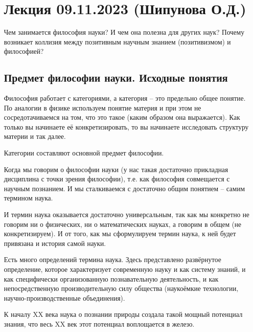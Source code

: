 \documentclass[main.tex]{subfiles}
\begin{document}
\section{Лекция 09.11.2023 (Шипунова О.Д.)}




Чем занимается философия науки?
И чем она полезна для других наук?
Почему возникает коллизия между позитивным научным знанием (позитивизмом) и философией?


\subsection{Предмет философии науки. Исходные понятия}


Философия работает с категориями, а категория -- это предельно общее понятие.
По аналогии в физике используем понятие материя и при этом не сосредотачиваемся на том, что это такое (каким образом она выражается).
Как только вы начинаете её конкретизировать, то вы начинаете исследовать структуру материи и так далее.

Категории составляют основной предмет философии.

Когда мы говорим о философии науки (у нас такая достаточно прикладная дисциплина с точки зрения философии), т.е. как философия совмещается с научным познанием.
И мы сталкиваемся с достаточно общим понятием -- самим термином наука.

И термин наука оказывается достаточно универсальным, так как мы конкретно не говорим ни о физических, ни о математических науках, а говорим в общем (не конкретизируем).
И от того, как мы сформулируем термин наука, к ней будет привязана и история самой науки.

Есть много определений термина наука.
Здесь представлено развёрнутое определение, которое характеризует современную науку и как систему знаний, и как специфически организованную познавательную деятельность, и как непосредственную производительную силу общества (наукоёмкие технологии, научно-производственные объединения).

К началу XX века наука о познании природы создала такой мощный потенциал знания, что весь XX век этот потенциал воплощается в железо.
\end{document}
